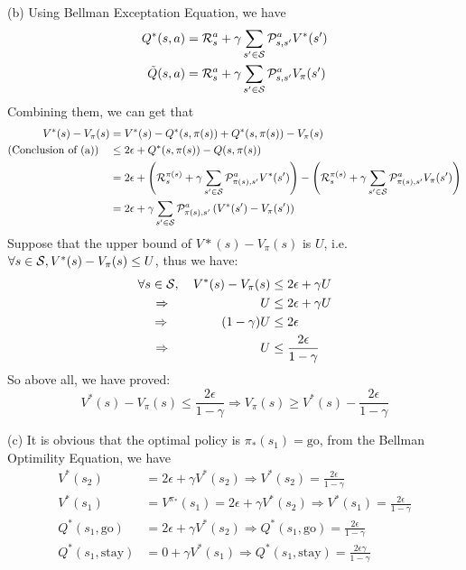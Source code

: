 \begin{homeworkProblem}
(b) Using Bellman Exceptation Equation, we have
\begin{align*}
Q^*(s, a) &= \mathcal{R}_s^{a} + \gamma\sum_{s'\in\mathcal{S}}\mathcal{P}_{s,s'}^aV^*(s') \\
\tilde{Q}(s, a) &= \mathcal{R}_s^{a} + \gamma\sum_{s'\in\mathcal{S}}\mathcal{P}_{s,s'}^aV_{\pi}(s')
\end{align*}
Combining them, we can get that
\begin{align*}
V^*(s) - V_{\pi}(s) &= V^*(s) - Q^*(s, \pi(s)) + Q^*(s, \pi(s)) - V_{\pi}(s) \\
\text{(Conclusion of (a))}\quad &\leq 2\epsilon + Q^*(s, \pi(s)) - Q(s, \pi(s)) \\
&= 2\epsilon + \left(\mathcal{R}_{s}^{\pi(s)} + \gamma\sum_{s'\in\mathcal{S}}\mathcal{P}_{\pi(s),s'}^aV^*(s')\right) - \left(\mathcal{R}_{s}^{\pi(s)} + \gamma\sum_{s'\in\mathcal{S}}\mathcal{P}_{\pi(s),s'}^aV_{\pi}(s')\right) \\
&= 2\epsilon + \gamma\sum_{s'\in\mathcal{S}}\mathcal{P}_{\pi(s),s'}^a\left(V^*(s') - V_{\pi}(s')\right)
\end{align*}
Suppose that the upper bound of $V*(s)-V_{\pi}(s)$ is $U$, i.e. $\forall s \in \mathcal{S}, V^*(s)-V_{\pi}(s) \leq U$, thus we have:
\begin{align*}
\forall s \in \mathcal{S},\quad V^*(s) - V_{\pi}(s) &\leq 2\epsilon + \gamma U \\
\Rightarrow \qquad\qquad\qquad\quad U &\leq 2\epsilon + \gamma U \\
\Rightarrow \qquad\qquad (1-\gamma)U &\leq 2\epsilon \\
\Rightarrow \qquad\qquad\qquad\quad U &\leq \dfrac{2\epsilon}{1-\gamma}
\end{align*}
So above all, we have proved:
$$V^*(s) - V_{\pi}(s)\leq \dfrac{2\epsilon}{1-\gamma} \Rightarrow V_{\pi}(s) \geq V^*(s) - \dfrac{2\epsilon}{1-\gamma}$$

(c) It is obvious that the optimal policy is $\pi_*(s_1)=\text{go}$, from the Bellman Optimility Equation, we have
\begin{align*}
V^*(s_2) &= 2\epsilon + \gamma V^*(s_2) \Rightarrow V^*(s_2) = \frac{2\epsilon}{1-\gamma} \\
V^*(s_1) &= V^{\pi_*}(s_1) = 2\epsilon + \gamma V^*(s_2) \Rightarrow V^*(s_1) = \frac{2\epsilon}{1-\gamma} \\
Q^*(s_1, \text{go}) &= 2\epsilon + \gamma V^*(s_2) \Rightarrow Q^*(s_1, \text{go}) = \frac{2\epsilon}{1-\gamma} \\
Q^*(s_1, \text{stay}) &= 0 + \gamma V^*(s_1) \Rightarrow Q^*(s_1, \text{stay}) = \frac{2\epsilon\gamma}{1-\gamma}
\end{align*}


\end{homeworkProblem}
